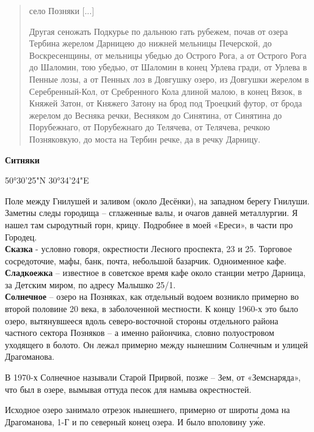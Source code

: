 \begin{quotation}
село Позняки [...]

Другая сеножать Подкурье по дальнюю гать рубежем, почав от озера Тербина жерелом Дарницею до нижней мельницы Печерской, до Воскресенщины, от мельницы убедью до Острого Рога, а от Острого Рога до Шаломин, тою убедью, от Шаломин в конец Урлева гради, от Урлева в Пенные лозы, а от Пенных лоз в Довгушку озеро, из Довгушки жерелом в Серебренный-Кол, от Сребренного Кола длиной малою, в конец Вязок, в Княжей Затон, от Княжего Затону на брод под Троецкий футор, от брода жерелом до Весняка речки, Весняком до Синятина, от Синятина до Порубежнаго, от Порубежнаго до Телячева, от Телячева, речкою Позняковкую, до моста на Тербин речке, да в речку Дарницу.
\end{quotation}



\textbf{Ситняки} 

50°30'25"N   30°34'24"E

Поле между Гнилушей и заливом (около Десёнки), на западном берегу Гнилуши. Заметны следы городища – сглаженные валы, и очагов давней металлургии. Я нашел там сыродутный горн, крицу. Подробнее в моей «Ереси», в части про Городец.\\

\textbf{Сказка} - условно говоря, окрестности Лесного проспекта, 23 и 25. Торговое сосредоточие, мафы, банк, почта, небольшой базарчик. Одноименное кафе.\\

\textbf{Сладкоежка} – известное в советское время кафе около станции метро Дарница, за Детским миром, по адресу Малышко 25/1.\\


\textbf{Солнечное} – озеро на Позняках, как отдельный водоем возникло примерно во второй половине 20 века, в заболоченной местности. К концу 1960-х это было озеро, вытянувшееся вдоль северо-восточной стороны отдельного района частного сектора Позняков – а именно райончика, словно полуостровом уходящего в болото. Он лежал примерно между нынешним Солнечным и улицей Драгоманова.

В 1970-х Солнечное называли Старой Прирвой, позже – Зем, от «Земснаряда», что был в озере, вымывая оттуда песок для намыва окрестностей.

Исходное озеро занимало отрезок нынешнего, примерно от широты дома на Драгоманова, 1-Г и по северный конец озера. И было вполовину у\'же.\\

